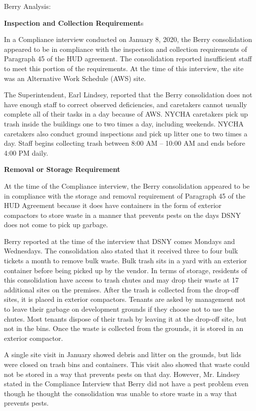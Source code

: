 Berry Analysis: 

\textbf{Inspection and Collection Requirement}s



In a Compliance interview conducted on January 8, 2020, the Berry consolidation appeared to be in compliance with the inspection and collection requirements of Paragraph 45 of the HUD agreement. The consolidation reported insufficient staff to meet this portion of the requirements. At the time of this interview, the site was an Alternative Work Schedule (AWS) site. 

The Superintendent, Earl Lindsey, reported that the Berry consolidation does not have enough staff to correct observed deficiencies, and caretakers cannot usually complete all of their tasks in a day because of AWS. NYCHA caretakers pick up trash inside the buildings one to two times a day, including weekends. NYCHA caretakers also conduct ground inspections and pick up litter one to two times a day. Staff begins collecting trash between 8:00 AM -- 10:00 AM and ends before 4:00 PM daily.

\textbf{Removal or Storage Requirement}



At the time of the Compliance interview, the Berry consolidation appeared to be in compliance with the storage and removal requirement of Paragraph 45 of the HUD Agreement because it does have containers in the form of exterior compactors to store waste in a manner that prevents pests on the days DSNY does not come to pick up garbage.



Berry reported at the time of the interview that DSNY comes Mondays and Wednesdays. The consolidation also stated that it received three to four bulk tickets a month to remove bulk waste. Bulk trash sits in a yard with an exterior container before being picked up by the vendor. In terms of storage, residents of this consolidation have access to trash chutes and may drop their waste at 17 additional sites on the premises. After the trash is collected from the drop-off sites, it is placed in exterior compactors. Tenants are asked by management not to leave their garbage on development grounds if they choose not to use the chutes. Most tenants dispose of their trash by leaving it at the drop-off site, but not in the bins. Once the waste is collected from the grounds, it is stored in an exterior compactor.  



A single site visit in January showed debris and litter on the grounds, but lids were closed on trash bins and containers.  This visit also showed that waste could not be stored in a way that prevents pests on that day. However, Mr. Lindsey stated in the Compliance Interview that Berry did not have a pest problem even though he thought the consolidation was unable to store waste in a way that prevents pests. 


